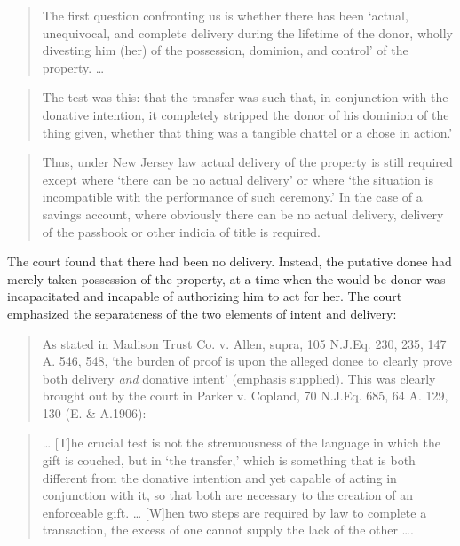 \begin{quote}
The first question confronting us is whether there has been `actual,
unequivocal, and complete delivery during the lifetime of the donor, wholly
divesting him (her) of the possession, dominion, and control' of the property.
\dots{} 
\end{quote}

\begin{quote}
The test was this: that the transfer was such that, in conjunction with the
donative intention, it completely stripped the donor of his dominion of the
thing given, whether that thing was a tangible chattel or a chose in action.'  
\end{quote}

\begin{quote}
Thus, under New Jersey law actual delivery of the property is still required
except where `there can be no actual delivery' or where `the situation is
incompatible with the performance of such ceremony.' In the case of a savings
account, where obviously there can be no actual delivery, delivery of the
passbook or other indicia of title is required. 
\end{quote}

The court found that there had been no delivery.  Instead, the putative donee
had merely taken possession of the property, at a time when the would-be donor
was incapacitated and incapable of authorizing him to act for her.  The court
emphasized the separateness of the two elements of intent and delivery:

\begin{quote}
As stated in Madison Trust Co. v. Allen, supra, 105 N.J.Eq. 230, 235, 147 A.
546, 548, `the burden of proof is upon the alleged donee to clearly prove both
delivery \textit{and} donative intent' (emphasis supplied). This was clearly
brought out by the court in Parker v. Copland, 70 N.J.Eq. 685, 64 A. 129, 130
(E. \& A.1906):
\end{quote}

\begin{quote}
\dots{} [T]he crucial test is not the strenuousness of the language in which the
gift is couched, but in `the transfer,' which is something that is both
different from the donative intention and yet capable of acting in conjunction
with it, so that both are necessary to the creation of an enforceable gift.
\dots{} [W]hen two steps are required by law to complete a transaction, the
excess of one cannot supply the lack of the other \dots{}.
\end{quote}

